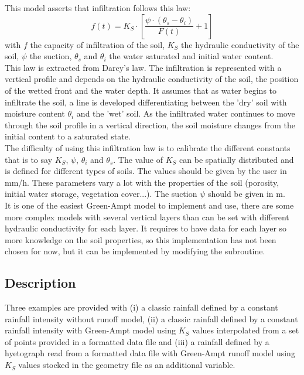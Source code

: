This model asserts that infiltration follows this law:
\begin{equation}
  f(t)=K_S\cdot[\frac{\psi\cdot(\theta_s-\theta_i)}{F(t)}+1]
\end{equation}
with $f$ the capacity of infiltration of the soil, $K_S$ the hydraulic
conductivity of the soil, $\psi$ the suction, $\theta_s$
and $\theta_i$ the water saturated and initial water content. \\
This law is extracted from Darcy's law.
The infiltration is represented with a vertical profile and depends on the
hydraulic conductivity of the soil, the position of the wetted front and the water
depth.
It assumes that as water begins to infiltrate the soil, a line is developed
differentiating between the 'dry' soil with moisture content $\theta_i$ and the
'wet' soil.
As the infiltrated water continues to move through the soil profile in a
vertical direction, the soil moisture changes from the initial content to a
saturated state. \\
The difficulty of using this infiltration law is to calibrate the different
constants that is to say $K_S$, $\psi$, $\theta_i$ and $\theta_s$.
The value of $K_S$ can be spatially distributed and is defined for different
types of soils.
The values should be given by the user in mm/h.
These parameters vary a lot with the properties of the soil (porosity, initial
water storage, vegetation cover...). The suction $\psi$ should be given in m. \\
It is one of the easiest Green-Ampt model to implement and use, there are some
more complex models with several vertical layers than can be set with different
hydraulic conductivity for each layer.
It requires to have data for each layer so more knowledge on the soil properties,
so this implementation has not been chosen for now, but it can be implemented by
modifying the subroutine.

\subsection{Description}

Three examples are provided with
(i) a classic rainfall defined by a constant rainfall intensity without runoff
model,
(ii) a classic rainfall defined by a constant rainfall intensity with Green-Ampt
model using $K_S$ values interpolated from a set of points provided in a
formatted data file and
(iii) a rainfall defined by a hyetograph read from a formatted data file with
Green-Ampt runoff model using $K_S$ values stocked in the geometry file as an
additional variable.

